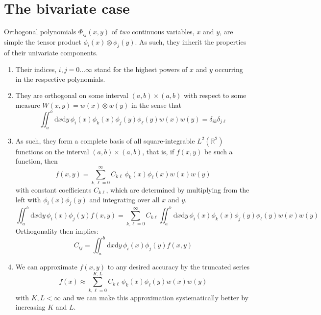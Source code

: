 \documentclass[]{report}
\begin{document}
	\section{The bivariate case}
	Orthogonal polynomials $\mathit{\Phi}_{ij}(x, y)$ of \emph{two} continuous variables, $x$ and $y$, are simple the tensor product $\phi_i(x)\otimes\phi_j(y)$. As such, they inherit the properties of their univariate components.
	\begin{enumerate}
		\item Their indices, $i,j = 0\ldots\infty$ stand for the highest powers of $x$ and $y$ occurring in the respective polynomials.
		\item They are orthogonal on some interval $(a,b)\times(a,b)$ with respect to some measure $W(x, y)=w(x)\otimes w(y)$ in the sense that
		\begin{equation}
			\iint_a^b\mathrm{d}x\mathrm{d}y\,\phi_i(x)\phi_k(x)\phi_j(y)\phi_\ell(y)w(x)w(y) = \delta_{ik}\delta_{j\ell}
		\end{equation}
		\item As such, they form a complete basis of all square-integrable $L^2(\mathbb{R}^2)$ functions on the interval $(a,b)\times(a,b)$, that is, if $f(x, y)$ be such a function, then
		\begin{equation}
			f(x, y)=\sum_{k,\ell=0}^{\infty}C_{k\ell}\,\phi_k(x)\phi_\ell(x)w(x)w(y)
		\end{equation}
		with constant coefficients $C_{k\ell}$, which are determined by multiplying from the left with $\phi_i(x)\phi_j(y)$ and integrating over all $x$ and $y$.
		\begin{equation*}
			\iint_a^b\mathrm{d}x\mathrm{d}y\,\phi_i(x)\phi_j(y)f(x, y) = \sum_{k,\ell=0}^{\infty}C_{k\ell}\iint_a^b\mathrm{d}x\mathrm{d}y\,\phi_i(x)\phi_k(x)\phi_j(y)\phi_\ell(y)w(x)w(y)
		\end{equation*}
		Orthogonality then implies:
		\begin{equation}
			C_{ij} = \iint_a^b\mathrm{d}x\mathrm{d}y\,\phi_i(x)\phi_j(y)f(x,y)
		\end{equation}
		\item We can approximate $f(x, y)$ to any desired accuracy by the truncated series
		\begin{equation}
			f(x)\approx\sum_{k, \ell=0}^{K, L}C_{k\ell}\,\phi_k(x)\phi_\ell(y)w(x)w(y)
		\end{equation}
		with $K, L < \infty$ and we can make this approximation systematically better by increasing $K$ and $L$.
	\end{enumerate}
	
\end{document}
